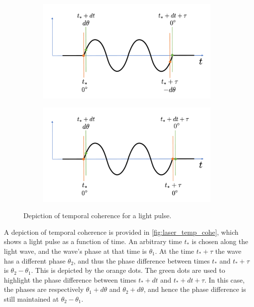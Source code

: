 \documentclass[a4paper,11pt]{report}
\begin{document}
\begin{figure}
    \centering
    \begin{subfigure}{.7\textwidth}
      \centering
      \includegraphics[width=\textwidth]{../../images/temp_cohe_2.pdf}
      \caption{}
      \label{fig:laser_temp_cohe_1}
    \end{subfigure}
    \begin{subfigure}{.7\textwidth}
        \centering
        \includegraphics[width=\textwidth]{../../images/temp_cohe_3.pdf}
        \caption{}
        \label{fig:laser_temp_cohe_2}
      \end{subfigure}
    \caption{Depiction of temporal coherence for a light pulse.}
    \label{fig:laser_temp_cohe_12}
\end{figure}

A depiction of temporal coherence is provided in \cref{fig:laser_temp_cohe}, which shows a light pulse as a function of time. An arbitrary time $t_*$ is chosen along the light wave, and the wave's phase at that time is $\theta_1$. At the time $t_* + \tau$ the wave has a different phase $\theta_2$, and thus the phase difference between times $t_*$ and $t_*+\tau$ is $\theta_2 - \theta_1$. This is depicted by the orange dots. The green dots are used to highlight the phase difference between times $t_*+dt$ and $t_*+dt+\tau$. In this case, the phases are respectively $\theta_1 + d\theta$ and $\theta_2 + d\theta$, and hence the phase difference is still maintained at $\theta_2 - \theta_1$.
\end{document}
